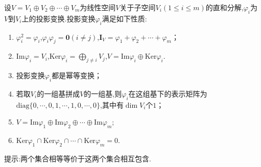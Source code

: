 \documentclass[../../main.tex]{subfiles}%
\begin{document}
\begin{proposition}[投影变换的性质]\label{proposition:投影变换的性质}
设\(V = V_1\oplus V_2\oplus\cdots\oplus V_m\)为线性空间\(V\)关于子空间\(V_i(1\leqslant  i\leqslant  m)\)的直和分解,\(\varphi_i\)为\(V\)到\(V_i\)上的投影变换.投影变换\(\varphi_i\)满足如下性质:
\begin{enumerate}[(1)]
\item \(\varphi_i^2 = \varphi_i\),\(\varphi_i\varphi_j = \boldsymbol{0}(i\neq j)\),\(\boldsymbol{I}_V = \varphi_1+\varphi_2+\cdots+\varphi_m\)；

\item \(\text{Im}\varphi_i = V_i\),\(\text{Ker}\varphi_i = \bigoplus_{j\neq i}V_j\),\(V = \text{Im}\varphi_i\oplus\text{Ker}\varphi_i\).

\item 投影变换\(\varphi_i\)都是幂等变换；

\item 若取\(V_i\)的一组基拼成\(V\)的一组基,则\(\varphi_i\)在这组基下的表示矩阵为\(\text{diag}\{0,\cdots,0,1,\cdots,1,0,\cdots,0\}\),其中有\(\dim V_i\)个\(1\)；

\item \(V = \text{Im}\varphi_1\oplus\text{Im}\varphi_2\oplus\cdots\oplus\text{Im}\varphi_m\);

\item \(\text{Ker}\varphi_1\cap\text{Ker}\varphi_2\cap\cdots\cap\text{Ker}\varphi_m = 0\).
\end{enumerate}
\end{proposition}
\begin{note}
提示:两个集合相等等价于这两个集合相互包含.
\end{note}
\end{document}
